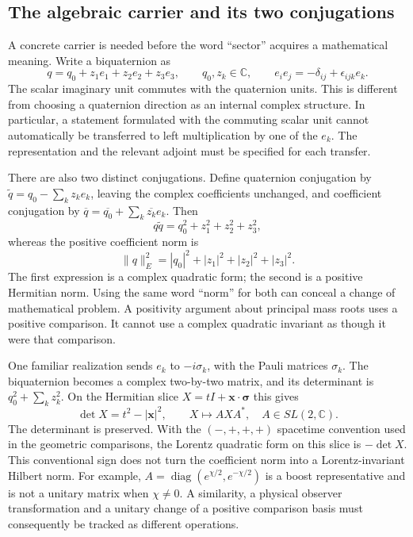 \subsection{The algebraic carrier and its two conjugations}
A concrete carrier is needed before the word ``sector'' acquires a
mathematical meaning. Write a biquaternion as
\begin{equation}
 q=q_0+z_1e_1+z_2e_2+z_3e_3,\qquad q_0,z_k\in\mathbb C,
 \qquad e_ie_j=-\delta_{ij}+\epsilon_{ijk}e_k.
\end{equation}
The scalar imaginary unit commutes with the quaternion units. This is
different from choosing a quaternion direction as an internal complex
structure. In particular, a statement formulated with the commuting
scalar unit cannot automatically be transferred to left multiplication
by one of the $e_k$. The representation and the relevant adjoint must
be specified for each transfer.

There are also two distinct conjugations. Define quaternion conjugation
by $\widetilde q=q_0-\sum_kz_ke_k$, leaving the complex coefficients
unchanged, and coefficient conjugation by
$\overline q=\overline{q_0}+\sum_k\overline{z_k}e_k$. Then
\begin{equation}
 q\widetilde q=q_0^2+z_1^2+z_2^2+z_3^2,
\end{equation}
whereas the positive coefficient norm is
\begin{equation}
 \|q\|_E^2=|q_0|^2+|z_1|^2+|z_2|^2+|z_3|^2.
\end{equation}
The first expression is a complex quadratic form; the second is a
positive Hermitian norm. Using the same word ``norm'' for both can
conceal a change of mathematical problem. A positivity argument about
principal mass roots uses a positive comparison. It cannot use a
complex quadratic invariant as though it were that comparison.

One familiar realization sends $e_k$ to $-i\sigma_k$, with the Pauli
matrices $\sigma_k$. The biquaternion becomes a complex two-by-two
matrix, and its determinant is $q_0^2+\sum_kz_k^2$. On the Hermitian
slice $X=tI+\boldsymbol x\cdot\boldsymbol\sigma$ this gives
\begin{equation}
 \det X=t^2-|\boldsymbol x|^2,\qquad
 X\longmapsto AXA^*,\quad A\in SL(2,\mathbb C).
\end{equation}
The determinant is preserved. With the $(-,+,+,+)$ spacetime
convention used in the geometric comparisons, the Lorentz quadratic
form on this slice is $-\det X$. This conventional sign does not
turn the coefficient norm into a Lorentz-invariant Hilbert norm.
For example, $A=\operatorname{diag}(e^{\chi/2},e^{-\chi/2})$
is a boost representative and is not a unitary matrix when
$\chi\ne0$. A similarity, a physical observer transformation and
a unitary change of a positive comparison basis must consequently be
tracked as different operations.

